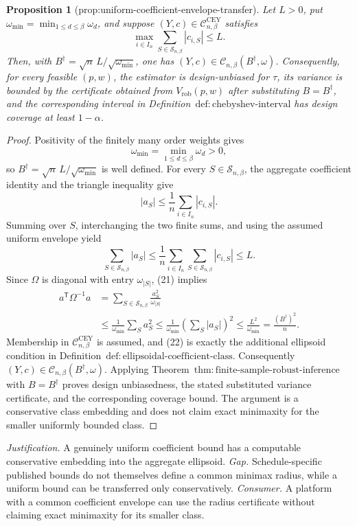 \documentclass{article}
\newtheorem{proposition}{Proposition}
\begin{document}
\begin{proposition}[prop:uniform-coefficient-envelope-transfer]\label{prop:uniform-coefficient-envelope-transfer}
Let \(L>0\), put \(\omega_{\min}=\min_{1\le d\le\beta}\omega_d\), and suppose \((Y,c)\in\mathcal C^{\mathrm{CEY}}_{n,\beta}\) satisfies
\[
\max_{i\in I_n}\sum_{S\in\mathcal S_{n,\beta}}|c_{i,S}|\le L.
\]
Then, with \(B^\dagger=\sqrt n\,L/\sqrt{\omega_{\min}}\), one has \((Y,c)\in\mathcal C_{n,\beta}(B^\dagger,\omega)\).  Consequently, for every feasible \((p,w)\), the estimator is design-unbiased for \(\tau\), its variance is bounded by the certificate obtained from \(V_{\mathrm{rob}}(p,w)\) after substituting \(B=B^\dagger\), and the corresponding interval in Definition~\(\mathrm{def{:}chebyshev\text{-}interval}\) has design coverage at least \(1-\alpha\).
\end{proposition}
\begin{proof}
Positivity of the finitely many order weights gives
\[
\omega_{\min}=\min_{1\le d\le\beta}\omega_d>0,
\]
so \(B^\dagger=\sqrt n\,L/\sqrt{\omega_{\min}}\) is well defined.  For every \(S\in\mathcal S_{n,\beta}\), the aggregate coefficient identity and the triangle inequality give
\[
|a_S|\le \frac1n\sum_{i\in I_n}|c_{i,S}|.
\]
Summing over \(S\), interchanging the two finite sums, and using the assumed uniform envelope yield
\[
\sum_{S\in\mathcal S_{n,\beta}}|a_S|
\le\frac1n\sum_{i\in I_n}
\sum_{S\in\mathcal S_{n,\beta}}|c_{i,S}|
\le L.
\tag{21}
\]
Since \(\Omega\) is diagonal with entry \(\omega_{|S|}\), (21) implies
\[
\begin{aligned}
a^{\mathsf T}\Omega^{-1}a
&=\sum_{S\in\mathcal S_{n,\beta}}\frac{a_S^2}{\omega_{|S|}}\\
&\le\frac1{\omega_{\min}}\sum_Sa_S^2
\le\frac1{\omega_{\min}}
\left(\sum_S|a_S|\right)^2
\le\frac{L^2}{\omega_{\min}}
=\frac{(B^\dagger)^2}{n}.
\end{aligned}
\tag{22}
\]
Membership in \(\mathcal C^{\mathrm{CEY}}_{n,\beta}\) is assumed, and (22) is exactly the additional ellipsoid condition in Definition~\(\mathrm{def{:}ellipsoidal\text{-}coefficient\text{-}class}\).  Consequently \((Y,c)\in\mathcal C_{n,\beta}(B^\dagger,\omega)\).  Applying Theorem~\(\mathrm{thm{:}finite\text{-}sample\text{-}robust\text{-}inference}\) with \(B=B^\dagger\) proves design unbiasedness, the stated substituted variance certificate, and the corresponding coverage bound.  The argument is a conservative class embedding and does not claim exact minimaxity for the smaller uniformly bounded class.
\end{proof}
\par\smallskip\noindent \textit{Justification.} A genuinely uniform coefficient bound has a computable conservative embedding into the aggregate ellipsoid. \textit{Gap.} Schedule-specific published bounds do not themselves define a common minimax radius, while a uniform bound can be transferred only conservatively. \textit{Consumer.} A platform with a common coefficient envelope can use the radius certificate without claiming exact minimaxity for its smaller class.
\end{document}
